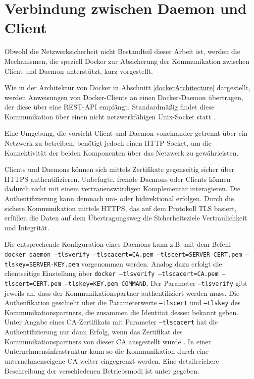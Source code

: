 \documentclass[../main.tex]{subfiles}
\begin{document}


  \section{Verbindung zwischen Daemon und Client}
  \label{conClientServer}
    Obwohl die Netzwerksicherheit nicht Bestandteil dieser Arbeit ist, werden die Mechanismen, die speziell Docker zur Absicherung der Kommunikation zwischen Client und Daemon unterstützt, kurz vorgestellt.

    Wie in der Architektur von Docker in Abschnitt \ref{dockerArchitecture} dargestellt, werden Anweisungen von Docker-Clients an einen Docker-Daemon übertragen, der diese über eine \acrshort{REST}-\acrshort{API} empfängt. Standardmäßig findet diese Kommunikation über einen nicht netzwerkfähigen Unix-Socket statt \cite{dockerSecurity}.

    Eine Umgebung, die vorsieht Client und Daemon voneinander getrennt über ein Netzwerk zu betreiben, benötigt jedoch einen HTTP-Socket, um die Konnektivität der beiden Komponenten über das Netzwerk zu gewährleisten.

    Clients und Daemons können sich mittels Zertifikate gegenseitig sicher über HTTPS authentifizieren. Unbefugte, fremde Daemons oder Clients können dadurch nicht mit einem vertrauenswürdigen Komplementär interagieren. Die Authentifizierung kann demnach uni- oder bidirektional erfolgen. Durch die sichere Kommunikation mittels HTTPS, das auf dem Protokoll \acrshort{TLS} basiert, erfüllen die Daten auf dem Übertragungsweg die Sicherheitsziele Vertraulichkeit und Integrität.

    Die entsprechende Konfiguration eines Daemons kann z.B. mit dem Befehl \texttt{docker daemon --tlsverify --tlscacert=CA.pem --tlscert=SERVER-CERT.pem --tlskey=SERVER-KEY.pem} vorgenommen werden. Analog dazu erfolgt die clientseitige Einstellung über \texttt{docker --tlsverify --tlscacert=CA.pem --tlscert=CERT.pem --tlskey=KEY.pem COMMAND}. Der Parameter \texttt{--tlsverify} gibt jeweils an, dass der Kommunikationspartner authentifiziert werden muss. Die Authenfikation geschieht über die Parameterwerte \texttt{--tlscert} und \texttt{--tlskey} des Kommunikationspartners, die zusammen die Identität dessen bekannt geben. Unter Angabe eines \acrshort{CA}-Zertifikats mit Parameter \texttt{--tlscacert} hat die Authentifizierung nur dann Erfolg, wenn das Zertifikat des Kommunikationspartners von dieser \acrshort{CA} ausgestellt wurde \cite{dockerSecurityHTTPS}. In einer Unternehmensinfrastruktur kann so die Kommunikation durch eine unternehmenseigene CA weiter eingegrenzt werden. Eine detailreichere Beschreibung der verschiedenen Betriebsmodi ist unter \cite{dockerSecurityHTTPS} gegeben.
\end{document}
